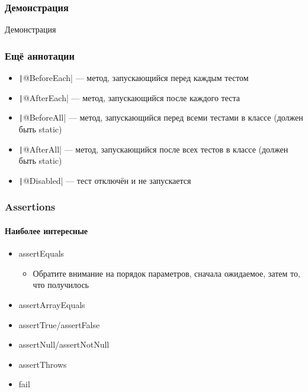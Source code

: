 \documentclass[xetex,mathserif,serif]{beamer}
\begin{document}
	\begin{frame}
		\frametitle{Демонстрация}
		\begin{center}
			\huge{Демонстрация}
		\end{center}
	\end{frame}

	\begin{frame}
		\frametitle{Ещё аннотации}
		\begin{itemize}
			\item \texttt|@BeforeEach| --- метод, запускающийся перед каждым тестом
			\item \texttt|@AfterEach| --- метод, запускающийся после каждого теста
			\item \texttt|@BeforeAll| --- метод, запускающийся перед всеми тестами в классе (должен быть static)
			\item \texttt|@AfterAll| --- метод, запускающийся после всех тестов в классе (должен быть static)
			\item \texttt|@Disabled| --- тест отключён и не запускается
		\end{itemize}
	\end{frame}

	\begin{frame}
		\frametitle{Assertions}
		\framesubtitle{Наиболее интересные}
		\begin{itemize}
			\item assertEquals
			\begin{itemize}
				\item Обратите внимание на порядок параметров, сначала ожидаемое, затем то, что получилось
			\end{itemize}
			\item assertArrayEquals
			\item assertTrue/assertFalse
			\item assertNull/assertNotNull
			\item assertThrows
			\item fail
		\end{itemize}
	\end{frame}
\end{document}

